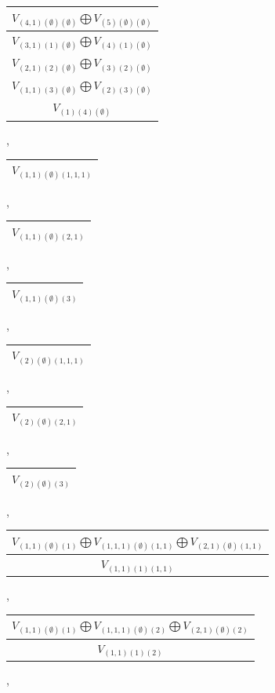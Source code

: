 \documentclass[letterpaper,11pt]{article}
\begin{document}
	\begin{tabular}{| c |}
		\hline
		$V_{(4,1)(\emptyset)(\emptyset)}$$\bigoplus$$V_{(5)(\emptyset)(\emptyset)}$\\
		\hline
		$V_{(3,1)(1)(\emptyset)}$$\bigoplus$$V_{(4)(1)(\emptyset)}$\\
		\hline
		$V_{(2,1)(2)(\emptyset)}$$\bigoplus$$V_{(3)(2)(\emptyset)}$\\
		\hline
		$V_{(1,1)(3)(\emptyset)}$$\bigoplus$$V_{(2)(3)(\emptyset)}$\\
		\hline
		$V_{(1)(4)(\emptyset)}$\\
		\hline
	\end{tabular}, 
	\newline
	\begin{tabular}{| c |}
		\hline
		$V_{(1,1)(\emptyset)(1,1,1)}$\\
		\hline
	\end{tabular}, 
	\begin{tabular}{| c |}
		\hline
		$V_{(1,1)(\emptyset)(2,1)}$\\
		\hline
	\end{tabular}, 
	\begin{tabular}{| c |}
		\hline
		$V_{(1,1)(\emptyset)(3)}$\\
		\hline
	\end{tabular}, 
	\begin{tabular}{| c |}
		\hline
		$V_{(2)(\emptyset)(1,1,1)}$\\
		\hline
	\end{tabular}, 
	\begin{tabular}{| c |}
		\hline
		$V_{(2)(\emptyset)(2,1)}$\\
		\hline
	\end{tabular}, 
	\begin{tabular}{| c |}
		\hline
		$V_{(2)(\emptyset)(3)}$\\
		\hline
	\end{tabular}, 
	\newline 
	\begin{tabular}{| c |}
		\hline
		$V_{(1,1)(\emptyset)(1)}$$\bigoplus$$V_{(1,1,1)(\emptyset)(1,1)}$$\bigoplus$$V_{(2,1)(\emptyset)(1,1)}$\\
		\hline
		$V_{(1,1)(1)(1,1)}$\\
		\hline
	\end{tabular}, 
	\begin{tabular}{| c |}
		\hline
		$V_{(1,1)(\emptyset)(1)}$$\bigoplus$$V_{(1,1,1)(\emptyset)(2)}$$\bigoplus$$V_{(2,1)(\emptyset)(2)}$\\
		\hline
		$V_{(1,1)(1)(2)}$\\
		\hline
	\end{tabular}, 
\end{document}
